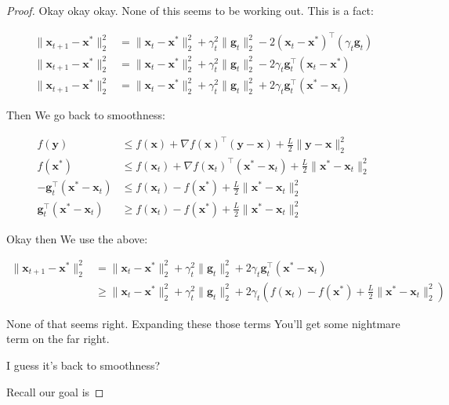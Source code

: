 \documentclass{article}
\begin{document}
\begin{proof}
	Okay okay okay. None of this seems to be working out. This is a fact:
	
	\begin{align}
		\| \mathbf{x}_{t+1} - \mathbf{x}^*\|^2_2  &= \|\mathbf{x}_t-\mathbf{x}^*\|^2_2 + \gamma_t^2\| \mathbf{g}_t\|^2_2 - 2(\mathbf{x}_t-\mathbf{x}^*)^\top(\gamma_t \mathbf{g}_t) \\
		\| \mathbf{x}_{t+1} - \mathbf{x}^*\|^2_2  &= \|\mathbf{x}_t-\mathbf{x}^*\|^2_2 + \gamma_t^2\| \mathbf{g}_t\|^2_2 - 2\gamma_t \mathbf{g}_t^\top(\mathbf{x}_t-\mathbf{x}^*)\\
		\| \mathbf{x}_{t+1} - \mathbf{x}^*\|^2_2  &= \|\mathbf{x}_t-\mathbf{x}^*\|^2_2 + \gamma_t^2\| \mathbf{g}_t\|^2_2 + 2\gamma_t \mathbf{g}_t^\top(\mathbf{x}^* - \mathbf{x}_t)
	\end{align}
	
	Then We go back to smoothness:
	
	\begin{align}
		f(\mathbf{y}) &\le f(\mathbf{x}) + \nabla f(\mathbf{x})^\top(\mathbf{y}-\mathbf{x}) + \frac{L}{2}\|\mathbf{y}-\mathbf{x}\|^2_2\\
		f(\mathbf{x}^*) &\le f(\mathbf{x}_t) + \nabla f(\mathbf{x}_t)^\top(\mathbf{x}^*-\mathbf{x}_t) + \frac{L}{2}\|\mathbf{x}^*-\mathbf{x}_t\|^2_2\\
		- \mathbf{g}_t^\top(\mathbf{x}^*-\mathbf{x}_t) &\le f(\mathbf{x}_t) -  f(\mathbf{x}^*)  + \frac{L}{2}\|\mathbf{x}^*-\mathbf{x}_t\|^2_2\\
		\mathbf{g}_t^\top(\mathbf{x}^*-\mathbf{x}_t) &\ge f(\mathbf{x}_t) -  f(\mathbf{x}^*)  + \frac{L}{2}\|\mathbf{x}^*-\mathbf{x}_t\|^2_2
	\end{align}
	
	Okay then We use the above:
	
	\begin{align}
		\| \mathbf{x}_{t+1} - \mathbf{x}^*\|^2_2  &= \|\mathbf{x}_t-\mathbf{x}^*\|^2_2 + \gamma_t^2\| \mathbf{g}_t\|^2_2 + 2\gamma_t \mathbf{g}_t^\top(\mathbf{x}^* - \mathbf{x}_t)\\
		& \ge \|\mathbf{x}_t-\mathbf{x}^*\|^2_2 + \gamma_t^2\| \mathbf{g}_t\|^2_2 + 2\gamma_t (f(\mathbf{x}_t) -  f(\mathbf{x}^*)  + \frac{L}{2}\|\mathbf{x}^*-\mathbf{x}_t\|^2_2)
	\end{align}
	
	None of that seems right. Expanding these those terms You'll get some nightmare term on the far right. 
	
	I guess it's back to smoothness? 
	
	Recall our goal is
	

\end{proof}
\end{document}
